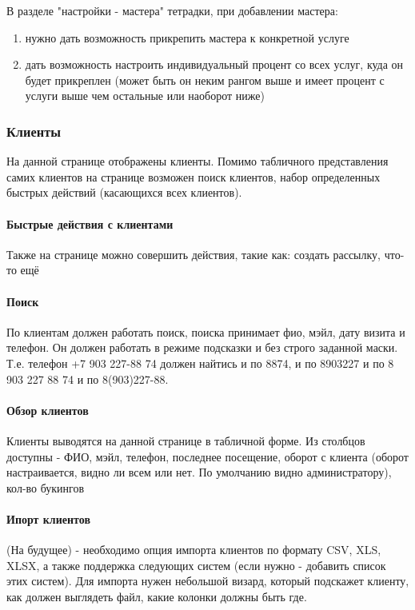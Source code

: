 \documentclass[DIV=calc, paper=a4, fontsize=11pt]{scrartcl} %
\begin{document}
	 В разделе "настройки - мастера" тетрадки, при добавлении мастера:
	\begin{enumerate}
	\item нужно дать возможность прикрепить мастера к конкретной услуге 
	\item дать возможность настроить индивидуальный процент со всех услуг, куда он будет прикреплен (может быть он неким рангом выше и имеет процент с услуги выше чем остальные или наоборот ниже)
\end{enumerate}


\subsubsection{Клиенты}
На данной странице отображены клиенты. Помимо табличного представления самих клиентов на странице возможен поиск клиентов, набор определенных быстрых действий (касающихся всех клиентов). 

\paragraph{Быстрые действия с клиентами} Также на странице можно совершить действия, такие как: создать рассылку, что-то ещё 

\paragraph{Поиск} По клиентам должен работать поиск, поиска принимает фио, мэйл, дату визита и телефон. Он должен работать в режиме подсказки и без строго заданной маски. Т.е. телефон +7 903 227-88 74 должен найтись и по 8874, и по 8903227 и по 8 903 227 88 74 и по 8(903)227-88. 

\paragraph{Обзор клиентов} Клиенты выводятся на данной странице в табличной форме. Из столбцов доступны - ФИО, мэйл, телефон, последнее посещение, оборот с клиента (оборот настраивается, видно ли всем или нет. По умолчанию видно администратору), кол-во букингов

\paragraph{Ипорт клиентов} \label{paragraph:import_clients}
(На будущее) - необходимо опция импорта клиентов по формату CSV, XLS, XLSX, а также поддержка следующих систем (если нужно - добавить список этих систем). Для импорта нужен небольшой визард, который подскажет клиенту, как должен выглядеть файл, какие колонки должны быть где.
\end{document}
